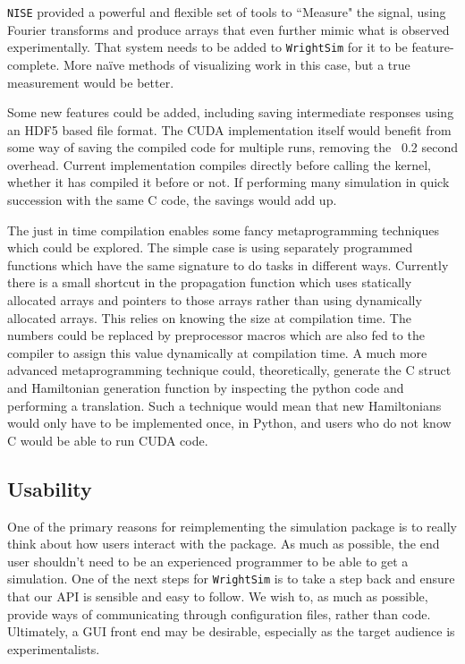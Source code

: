 \documentclass[fontsize=11pt]{scrartcl}
\numberwithin{equation}{section}		%
\numberwithin{figure}{section}			%
\numberwithin{table}{section}				%
\begin{document}
\texttt{NISE} provided a powerful and flexible set of tools to ``Measure" the signal, using Fourier transforms and produce arrays that even further mimic what is observed experimentally.
That system needs to be added to \texttt{WrightSim} for it to be feature-complete. 
More na{\"i}ve methods of visualizing work in this case, but a true measurement would be better.

Some new features could be added, including saving intermediate responses using an HDF5 based file format.
The CUDA implementation itself would benefit from some way of saving the compiled code for multiple runs, removing the ~0.2 second overhead.
Current implementation compiles directly before calling the kernel, whether it has compiled it before or not.
If performing many simulation in quick succession with the same C code, the savings would add up.

The just in time compilation enables some fancy metaprogramming techniques which could be explored.
The simple case is using separately programmed functions which have the same signature to do tasks in different ways.
Currently there is a small shortcut in the propagation function which uses statically allocated arrays and pointers to those arrays rather than using dynamically allocated arrays.
This relies on knowing the size at compilation time.
The numbers could be replaced by preprocessor macros which are also fed to the compiler to assign this value dynamically at compilation time.
A much more advanced metaprogramming technique could, theoretically, generate the C struct and Hamiltonian generation function by inspecting the python code and performing a translation.
Such a technique would mean that new Hamiltonians would only have to be implemented once, in Python, and users who do not know C would be able to run CUDA code.

\subsection{Usability}

One of the primary reasons for reimplementing the simulation package is to really think about how users interact with the package.
As much as possible, the end user shouldn't need to be an experienced programmer to be able to get a simulation.
One of the next steps for \texttt{WrightSim} is to take a step back and ensure that our API is sensible and easy to follow.
We wish to, as much as possible, provide ways of communicating through configuration files, rather than code.
Ultimately, a GUI front end may be desirable, especially as the target audience is experimentalists.
\end{document}
